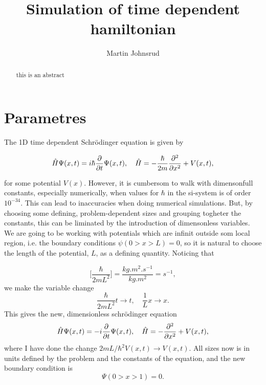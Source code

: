 \documentclass{article}
\title{Simulation of time dependent hamiltonian}
\author{Martin Johnsrud}
\date{}
\begin{document}
\maketitle
\begin{abstract}
    this is an abstract
\end{abstract}
\section*{Parametres}

    The 1D time dependent Schrödinger equation is given by

    \begin{equation*}
        \hat H \Psi(x, t) = i \hbar \pdv{t} \Psi(x, t), \quad \hat H = -\frac{\hbar}{2m}\pdv[2]{x} + V(x, t),
    \end{equation*}

    for some potential $V(x)$. However, it is cumbersom to walk with dimensonfull constants, especially numerically, when values for $\hbar$ in the si-system is of order $10^{-34}$. This can lead to inaccuracies when doing numerical simulations. But, by choosing some defining, problem-dependent sizes and grouping togheter the constants, this can be liminated by the introduction of dimensonless variables. We are going to be working with potentials which are infinit outside som local region, i.e. the boundary conditions $\psi(0>x>L) = 0$, so it is natural to choose the length of the potential, $L$, as a defining quantity. Noticing that

    \begin{equation*}
        \bigg[\frac{\hbar}{2 m L^2} \bigg] = \frac{\si{kg.m^2.s^{-1}}}{\si{kg.m^2}} = \si{s^{-1}},
    \end{equation*}
    we make the variable change
    \begin{equation*}
        \frac{\hbar}{2 m L^2}t \rightarrow t, \quad \frac{1}{L}x \rightarrow x.
    \end{equation*}
    This gives the new, dimensionless schrödinger equation
    \begin{equation}
        \hat H \Psi(x, t) = -i \pdv{t} \Psi(x, t), \quad \hat H = -\pdv[2]{x} + V(x, t),
        \label{time_depend}
    \end{equation}
    where I have done the change $2mL/\hbar^2V(x, t) \rightarrow V(x, t)$. All sizes now is in units defined by the problem and the constants of the equation, and the new boundary condition is 
    \begin{equation*}
        \Psi(0>x>1) = 0.
    \end{equation*}
\end{document}
